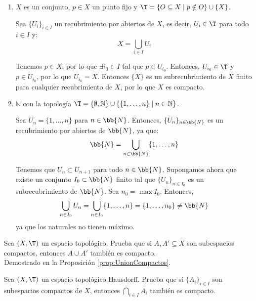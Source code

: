 \begin{ejercicio}
\begin{enumerate}
    \item $X $ es un conjunto, $ p \in X $ un punto fijo y $ \T = \{O \subseteq X \mid p \notin O\} \cup \{X\}$.
    
    Sea $\{U_i\}_{i\in I}$ un recubrimiento por abiertos de $X$, es decir, $U_i\in \T$ para todo $i\in I$ y:
    \begin{equation*}
        X = \bigcup_{i\in I} U_i
    \end{equation*}

    Tenemos $p\in X$, por lo que $\exists i_0\in I$ tal que $p\in U_{i_0}$. Entonces, $U_{i_0}\in \T$ y $p\in U_{i_0}$, por lo que $U_{i_0}=X$.
    Entonces $\{X\}$ es un subrecubrimiento de $X$ finito para cualquier recubrimiento de $X$, por lo que $X$ es compacto.

    \item $\mathbb{N} $ con la topología $ \T = \{\emptyset, \mathbb{N}\} \cup \{\{1, \ldots, n\} \mid n \in \mathbb{N}\} $.
    
    Sea $U_n=\{1,\ldots,n\}$ para $n\in \bb{N}$. Entonces, $\{U_n\}_{n\in \bb{N}}$ es un recubrimiento por abiertos de $\bb{N}$, ya que:
    \begin{equation*}
        \bb{N} = \bigcup_{n\in \bb{N}} \{1,\ldots,n\}
    \end{equation*}

    Tenemos que $U_n\subset U_{n+1}$ para todo $n\in \bb{N}$. Supongamos ahora que existe un conjunto $I_0\subset \bb{N}$ finito tal que $\{U_n\}_{n\in I_0}$ es un subrecubrimiento de $\bb{N}$.
    Sea $n_0=\max I_0$. Entonces,
    \begin{equation*}
        \bigcup_{n\in I_0} U_n = \bigcup_{n\in I_0} \{1,\ldots,n\} = \{1,\ldots,n_0\} \neq \bb{N}
    \end{equation*}
    ya que los naturales no tienen máximo.

\end{enumerate}
\end{ejercicio}

\begin{ejercicio}
    Sea $(X, \T)$ un espacio topológico. Prueba que si $ A, A' \subseteq X $ son subespacios compactos, entonces $ A \cup A' $ también es compacto.\\

    Demostrado en la Proposición \ref{prop:UnionCompactos}.
\end{ejercicio}


\begin{ejercicio}
    Sea $(X, \T)$ un espacio topológico Hausdorff. Prueba que si $\{A_i\}_{i \in I}$ son subespacios compactos de $X$, entonces $\bigcap\limits_{i \in I} A_i$ también es compacto.
\end{ejercicio}

